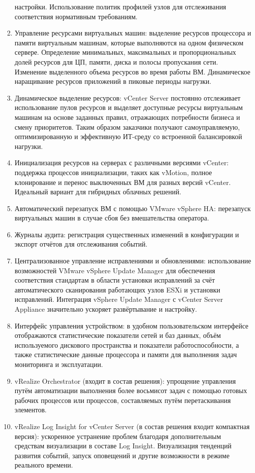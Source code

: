 \documentclass[14pt, a4paper]{article}
\begin{document}
\begin{enumerate}
    настройки. Использование политик профилей узлов для отслеживания соответствия
    нормативным требованиям.
    \item Управление ресурсами виртуальных машин: выделение ресурсов процессора и памяти
    виртуальным машинам, которые выполняются на одном физическом сервере. Определение
    минимальных, максимальных и пропорциональных долей ресурсов для ЦП, памяти, диска и
    полосы пропускания сети. Изменение выделенного объема ресурсов во время работы ВМ.
    Динамическое наращивание ресурсов приложений в пиковые периоды нагрузки.
    \item Динамическое выделение ресурсов: vCenter Server постоянно отслеживает использование
    пулов ресурсов и выделяет доступные ресурсы виртуальным машинам на основе заданных
    правил, отражающих потребности бизнеса и смену приоритетов. Таким образом заказчики
    получают самоуправляемую, оптимизированную и эффективную ИТ-среду со встроенной
    балансировкой нагрузки.
    \item Инициализация ресурсов на серверах с различными версиями vCenter: поддержка процессов
    инициализации, таких как vMotion, полное клонирование и перенос выключенных ВМ для
    разных версий vCenter. Идеальный вариант для гибридных облачных решений.
    \item Автоматический перезапуск ВМ с помощью VMware vSphere HA: перезапуск виртуальных
    машин в случае сбоя без вмешательства оператора.
    \item Журналы аудита: регистрация существенных изменений в конфигурации и экспорт отчётов
    для отслеживания событий.
    \item Централизованное управление исправлениями и обновлениями: использование возможностей
    VMware vSphere Update Manager для обеспечения соответствия стандартам в области
    установки исправлений за счёт автоматического сканирования работающих узлов ESXi и
    установки исправлений. Интеграция vSphere Update Manager с vCenter Server Appliance
    значительно ускоряет развёртывание и настройку.
    \item Интерфейс управления устройством: в удобном пользовательском интерфейсе отображаются
    статистические показатели сетей и баз данных, объём используемого дискового пространства
    и показатели работоспособности, а также статистические данные процессора и памяти для
    выполнения задач мониторинга и эксплуатации.
    \item vRealize Orchestrator (входит в состав решения): упрощение управления путём автоматизации
    выполнения более восьмисот задач с помощью готовых рабочих процессов или процессов,
    составляемых путём перетаскивания элементов.
    \item vRealize Log Insight for vCenter Server (в состав решения входит компактная версия):
    ускоренное устранение проблем благодаря дополнительным средствам визуализации в
    составе Log Insight. Визуализация тенденций развития событий, запуск оповещений и другие
    возможности в режиме реального времени.
\end{enumerate}
\end{document}
